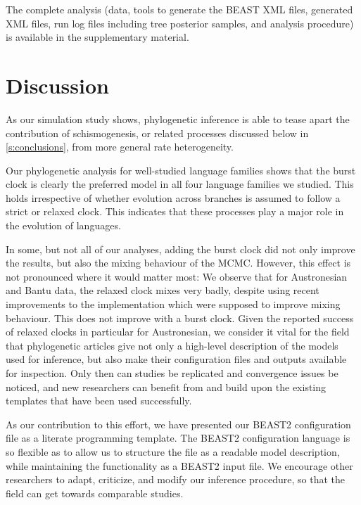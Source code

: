\documentclass[]{rsos}%
\begin{document}
The complete analysis (data, tools to generate the BEAST XML files, generated XML files,
run log files including tree posterior samples, and analysis procedure) is
available in the supplementary material.

\section{Discussion}\label{s:discussion}

As our simulation study shows, phylogenetic inference is able to tease
apart the contribution of schismogenesis, or
related processes discussed below in \cref{s:conclusions}, from more general rate heterogeneity.

Our phylogenetic analysis for well-studied language families shows that the
burst clock is clearly the preferred model in all four language families we studied. This holds
irrespective of whether evolution across branches is assumed to follow a strict or
relaxed clock.
This indicates that these processes play a major role in the evolution of
languages.

In some, but not all of our analyses, adding the burst clock did not only
improve the results, but also the mixing behaviour of the MCMC. However, this
effect is not pronounced where it would matter most: We observe that for
Austronesian and Bantu data, the relaxed clock mixes very badly, despite using
recent improvements to the implementation which were supposed to improve mixing
behaviour. This does not improve with a burst clock. Given the reported success
of relaxed clocks in particular for Austronesian, we consider it vital for the
field that phylogenetic articles give not only a high-level description of the
models used for inference, but also make their configuration files and outputs
available for inspection.
Only then can studies be replicated and convergence issues be noticed, and
new researchers can benefit from and build upon the existing templates that
have been used successfully.

As our contribution to this effort, we have presented our BEAST2 configuration
file as a literate programming template. The BEAST2 configuration language is so
flexible as to allow us to structure the file as a readable model description,
while maintaining the functionality as a BEAST2 input file. We encourage other
researchers to adapt, criticize, and modify our inference procedure, so that the
field can get towards comparable studies.
\end{document}
